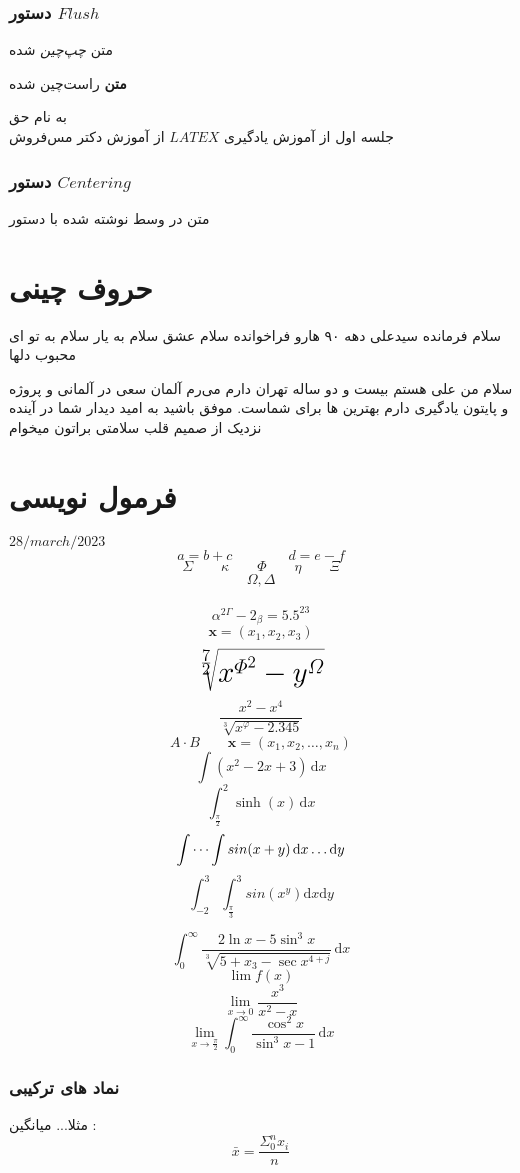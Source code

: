 \documentclass[12pt]{book}
\begin{document}
\subsection{دستور $Flush$}
\begin{flushleft}
	متن \textit{چپ‌چین} شده
\end{flushleft}

\begin{flushright}
	\textbf{متن} راست‌چین شده
\end{flushright}

به نام حق \\
جلسه اول از آموزش یادگیری $LATEX$ از آموزش دکتر مس‌فروش

\subsection{دستور $Centering$}
\centering
متن در وسط نوشته شده با دستور 

\chapter{حروف چینی}\label{chap3}
\begin{multicols}{2}
	سلام فرمانده سیدعلی دهه ۹۰ هارو فراخوانده سلام عشق سلام به یار سلام به تو ای محبوب دلها
	
	\shapepar{\hexagonshape}
سلام من علی هستم بیست و دو ساله تهران دارم می‌رم آلمان سعی در آلمانی و پروژه و پایتون یادگیری دارم بهترین ها برای شماست. موفق باشید به امید دیدار شما در آینده نزدیک از صمیم قلب سلامتی براتون میخوام
\end{multicols}
\chapter{فرمول نویسی}\label{chap4}

$28 /march/ 2023$
\[
a = b + c \qquad \qquad d  = e - f 
\]
\[
\Sigma \qquad \kappa \qquad \Phi \qquad \eta \qquad \Xi
\]
\[
\boldsymbol{\varOmega, \varDelta}
\]
\\
\[
\alpha^{2\varGamma} - 2_{\beta} = 5.5^{23}
\]
\[
\mathbf{x} = (x_1,x_2,x_3)
\]
\[
\huge{\sqrt[\frac72]{x^{\varPhi^{2}} - y^\varOmega}}
\]
\[
\frac{x^2 - x^4}{\sqrt[3]{x^\varphi - 2.345}}
\]
\[
A \cdot B \qquad \mathbf{x} = (x_1,x_2,\dots,x_n)
\]
\[
\int (x^2 - 2x + 3) \, \mathrm{d}x
\]
\[
\int_{\tfrac{\pi}2}^{2} \sinh(x) \, \mathrm{d}x
\]
\[
\idotsint sin(x+y) \, \mathrm{d}x \dots \mathrm{d}y
\]
\[
\int_{-2}^{3} \int_{\tfrac{\pi}{3}}^{3} sin(x^y) \mathrm{d}x \mathrm{d}y
\]

\[
\int_{0}^{\infty} \frac{2\ln x - 5\sin^3 x}{\sqrt[3]{5 + x_3 - \sec x^{4+j}}} \, \mathrm{d}x
\]
\[
\lim f(x) 
\]
\[
\lim_{x \to 0} \frac{x^{3}}{x^{2} - x}
\]
\[
\lim_{x \to \tfrac{\pi}{2}} \int_{0}^{\infty} \frac{\cos ^{2}x}{\sin ^{3}x - 1} \, \mathrm{d}x
\]

\begin{flushright}
\subsection{نماد های ترکیبی}
   مثلا... 
   میانگین :
   \[
   \bar{x} = \frac{\Sigma_{0}^{n} x_{i}}{n}
   \]
\end{flushright}
\end{document}
